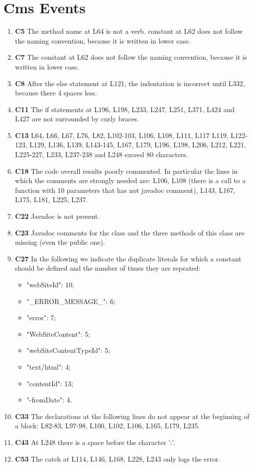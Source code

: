 \section{Cms Events}

\begin{enumerate}
\item \textbf{C5} The method name at L64 is not a verb. constant at L62 does not follow the naming convention, because it is written in lower case.
\item \textbf{C7} The constant at L62 does not follow the naming convention, because it is written in lower case.
\item \textbf{C8} After the else statement at L121, the indentation is incorrect until L332, because there 4 spaces less.
\item \textbf{C11} The if statements at L196, L198, L233, L247, L251, L371, L424 and L427 are not surrounded by curly braces.
\item \textbf{C13} L64, L66, L67, L76, L82, L102-103, L106, L108, L111, L117 L119, L122-123, L129, L136, L139, L143-145, L167, L179, L196, L198, L206, L212, L221, L225-227, L233, L237-238 and L248 exceed 80 characters.
\item \textbf{C18} The code overall results poorly commented. In particular the lines in which the comments are strongly needed are: L106, L108 (there is a call to a function with 10 parameters that has not javadoc comment), L143, L167, L175, L181, L225, L237.
\item \textbf{C22} Javadoc is not present.
\item \textbf{C23} Javadoc comments for the class and the three methods of this class are missing (even the public one).
\item \textbf{C27} In the following we indicate the duplicate literals for which a constant should be defined and the number of times they are repeated:
	\begin{itemize}
	\item "webSiteId": 10;
	\item "\_ERROR\_MESSAGE\_": 6;
	\item "error": 7;
	\item "WebSiteContent": 5;
	\item "webSiteContentTypeId": 5;
	\item "text/html": 4;
	\item "contentId": 13;
	\item "-fromDate": 4.
	\end{itemize} 
\item \textbf{C33} The declarations at the following lines do not appear at the beginning of a block: L82-83, L97-98, L100, L102, L106, L165, L179, L235. 
\item \textbf{C43} At L248 there is a space before the character ':'.
\item \textbf{C53} The catch at L114, L146, L168, L228, L243 only logs the error.
\end{enumerate}